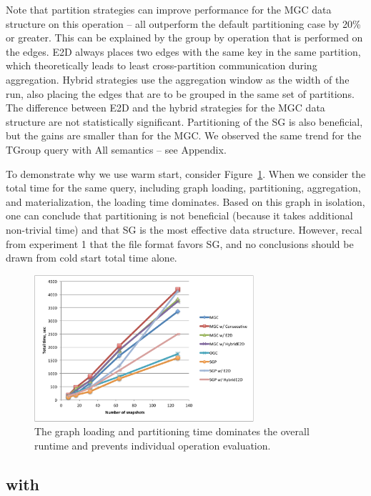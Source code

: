 Note that partition strategies can improve performance for the MGC
data structure on this operation -- all outperform the default
partitioning case by 20\% or greater.  This can be explained by the
group by operation that is performed on the edges.  E2D always places
two edges with the same key in the same partition, which theoretically
leads to least cross-partition communication during aggregation.
Hybrid strategies use the aggregation window as the width of the run,
also placing the edges that are to be grouped in the same set of
partitions.  The difference between E2D and the hybrid strategies for
the MGC data structure are not statistically significant.
Partitioning of the SG is also beneficial, but the gains are smaller
than for the MGC.  We observed the same trend for the TGroup query
with All semantics -- see Appendix.

To demonstrate why we use warm start, consider
Figure~\ref{fig:tgroupe_cold}.  When we consider the total time for
the same query, including graph loading, partitioning, aggregation,
and materialization, the loading time dominates.  Based on this graph
in isolation, one can conclude that partitioning is not beneficial
(because it takes additional non-trivial time) and that SG is the most
effective data structure.  However, recal from experiment 1 that the
file format favors SG, and no conclusions should be drawn from cold
start total time alone.

\begin{figure}[t!]
\includegraphics[width=3.2in]{figs/tgroupe_cold.pdf}
\caption{The graph loading and partitioning time dominates the overall
  runtime and prevents individual operation evaluation.}
\label{fig:tgroupe_cold}
\end{figure}


\subsection{ with }

